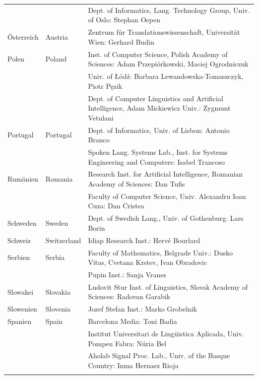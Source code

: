 \documentclass[]{../../metanetpaper}
\begin{document}
\begin{longtable}{llp{105mm}}
  & & Dept. of Informatics, Lang. Technology Group, Univ. of Oslo: Stephan Oepen \\ \addlinespace
  Österreich & \textcolor{grey1}{Austria} & Zentrum für Translationswissenschaft, Universität Wien: Gerhard Budin\\ \addlinespace 
  Polen & \textcolor{grey1}{Poland} & Inst. of Computer Science, Polish Academy of Sciences: Adam Przepiórkowski, Maciej Ogrodniczuk \\ \addlinespace
  & & Univ. of Łódź: Barbara Lewandowska-Tomaszczyk, Piotr Pęzik\\ \addlinespace
  & & Dept. of Computer Linguistics and Artificial Intelligence, Adam Mickiewicz Univ.: Zygmunt Vetulani \\ \addlinespace
  Portugal & \textcolor{grey1}{Portugal} & Dept. of Informatics, Univ. of Lisbon: Antonio Branco\\ \addlinespace
  & & Spoken Lang. Systems Lab., Inst. for Systems Engineering and Computers: Isabel Trancoso \\ \addlinespace
  Rumänien & \textcolor{grey1}{Romania} & Research Inst. for Artificial Intelligence, Romanian Academy of Sciences: Dan Tufis \\ \addlinespace
  & & Faculty of Computer Science, Univ. Alexandru Ioan Cuza: Dan Cristea \\ \addlinespace
  Schweden & \textcolor{grey1}{Sweden} & Dept. of Swedish Lang., Univ. of Gothenburg: Lars Borin \\ \addlinespace 
  Schweiz & \textcolor{grey1}{Switzerland} & Idiap Research Inst.: Hervé Bourlard \\ \addlinespace 
  Serbien & \textcolor{grey1}{Serbia} & Faculty of Mathematics, Belgrade Univ.: Dusko Vitas, Cvetana Krstev, Ivan Obradovic \\ \addlinespace
  & & Pupin Inst.: Sanja Vranes \\ \addlinespace  
  Slowakei & \textcolor{grey1}{Slovakia} & Ludovit Stur Inst. of Linguistics, Slovak Academy of Sciences: Radovan Garabik \\ \addlinespace 
  Slowenien & \textcolor{grey1}{Slovenia} & Jozef Stefan Inst.: Marko Grobelnik \\ \addlinespace 
  Spanien & \textcolor{grey1}{Spain} & Barcelona Media: Toni Badia \\ \addlinespace 
  & & Institut Universitari de Lingüistica Aplicada, Univ. Pompeu Fabra: Núria Bel \\ \addlinespace 
  & & Aholab Signal Proc. Lab., Univ. of the Basque Country: Inma Hernaez Rioja \\ \addlinespace 

\end{longtable}
\end{document}
